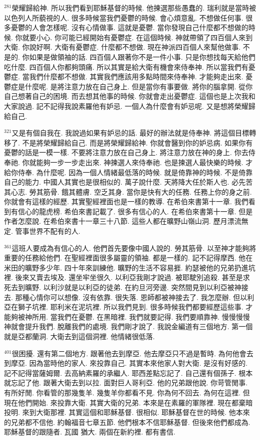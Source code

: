 \documentclass{book}
\begin{document}
$^{281}$榮耀歸給神.
所以我們看到耶穌基督的時候.
他揀選那些愚蠢的.
瑞利就是當時被以色列人所藐視的人.
很多時候當我們憂鬱的時候.
會心煩意亂.
不想做任何事.
很多憂鬱的人會怎樣呢.
沒有心情做事.
這就是憂鬱.
當你發現自己什麼都不想做的時候.
你就要小心.
你可能已經開始有憂鬱症.
在這個時候.
神就帶領了四百個人來到大衛.
你說好啊.
大衛有憂鬱症.
什麼都不想做.
現在神派四百個人來幫他做事.
不是的.
你如果是做領袖的話.
四百個人跟著你不是一件小事.
只是你想找每天給他們吃什麼.
四百個人你都夠頭痛.
所以其實是給大衛有機會來侍奉神.
所以當我們有憂鬱症.
當我們什麼都不想做.
其實我們應該用多點時間來侍奉神.
才能夠走出來.
憂鬱症是什麼呢.
是將注意力放在自己身上.
但是當你有事要做.
將你的腦拿開.
從你自己想著自己的困境.
而去想其他事的時候.
你就會走出憂鬱症.
這個也是上次我和大家說過.
記不記得我說素羅他有妒忌.
一個人為什麼會有妒忌呢.
又是想將榮耀歸給自己.

$^{321}$又是有個自我在.
我說過如果有妒忌的話.
最好的辦法就是侍奉神.
將這個目標轉移了.
不是將榮耀歸給自己.
而是將榮耀歸給神.
你就會醫到你的妒忌病.
如果你有憂鬱的話是一模一樣.
不要將注意力放在自己身上.
將注意力放在神的身上.
你去侍奉祂.
你就能夠一步一步走出來.
神揀選人來侍奉祂.
也是揀選人最快樂的時候.
才給你侍奉.
為什麼呢.
因為一個人情緒最低落的時候.
就是倚靠神的時候.
不是倚靠自己的能力.
中國人其實也是很相似的.
萬子說什麼.
天將降大任於斯人也.
必先苦其心志.
勞其筋骨.
餓其體膚.
空乏其身.
當你是快有大的任務.
任務上你的身之前.
你就會有這樣的經歷.
其實聖經裡面也是一樣的教導.
在希伯來書第十一章.
我們看到有信心的龍虎榜.
希伯來書記載了.
很多有信心的人.
在希伯來書第十一章.
但是作者怎麼說.
在希伯來書十一章三十八節.
這些人都在曠野山嶺山洞.
歷月漂流無定.
管事世界不配有的人.

$^{361}$這班人要成為有信心的人.
他們首先要像中國人說的.
勞其筋骨.
以至神才能夠將重要的任務給他們.
在聖經裡面很多屬靈的領袖.
都是一樣的.
記不記得摩西.
他在米田的曠野多少年.
四十年來訓練他.
曠野的生活不容易捱.
約瑟被他的兄弟扔進坑裡.
後來又賣去埃及.
還坐牢坐很久.
以利亞我剛才說過.
被耶駛別追殺.
甚至是求死去到曠野.
以利沙就是以利亞的徒弟.
在約旦河旁邊.
突然間見到以利亞被神接去.
那種心情你可以想像.
沒有依靠.
很失落.
恩師都被神接去了.
我怎麼辦.
但以利亞在獅子坑裡.
耶利米在泥坑裡.
所以我們見到.
很多時候我們都要經歷這些事.
才能夠被神所用.
當我們在憂鬱.
在黑暗裡.
我們就要記得.
我們要順靠神.
慢慢慢慢神就會提升我們.
脫離我們的處境.
我們剛才說了.
我說金編道有三個地方.
第一個就是亞都蘭洞.
大衛去到這個洞裡.
他情緒很低落.

$^{401}$很困擾.
還有第二個地方.
跟著他去到摩亞.
他去摩亞只不過是暫時.
為何他會去到摩亞.
因為當時他的家人.
來投靠自己.
其實本來他家人對大衛.
是沒有好感的.
記不記得當薩姆爾.
去高納素羅的承繼人.
耶西差點忘記了.
自己還有個孫子.
根本就忘記了他.
跟著大衛去到以拉.
面對巨人哥利亞.
他的兄弟跟他說.
你苛管閒事.
有所好閒.
你看管的那幾隻羊.
幾隻羊你都看不見.
你為何不回去.
為何在這裡.
但現在他們開始.
來投靠大衛.
其實大衛的兄弟.
本來是在素羅的軍隊裡.
現在都棄暗投明.
來到大衛那裡.
其實這個和耶穌基督.
很相似.
耶穌基督在世的時候.
他本來的兄弟都不信他.
約翰福音七章五節.
他們根本不信耶穌基督.
但後來他們都成為.
耶穌基督的跟隨者.
瓦國 猶大.
兩個在新約裡.
都有書信.
\end{document}
